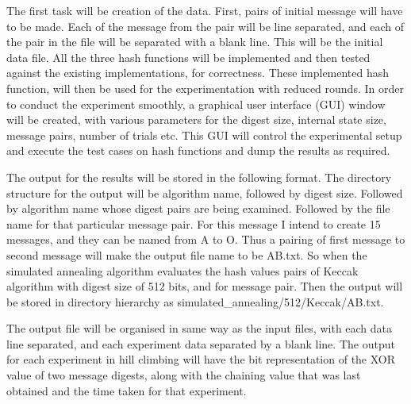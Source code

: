\documentclass[12pt]{artikel3}                  %
\begin{document}
The first task will be creation of the data. First, pairs of initial message will have to be 
made. Each of the message from the pair will be line separated, and each of the pair in the file
will be separated with a blank line. This will be the initial data file. All the three hash functions
will be implemented and then tested against the existing implementations, for correctness. These
implemented hash function, will then be used for the experimentation with reduced rounds. In order
to conduct the experiment smoothly, a graphical user interface (GUI) window will be created, with
various parameters for the digest size, internal state size, message pairs, number of trials etc.
This GUI will control the experimental setup and execute the test cases on hash functions and dump
the results as required.

The output for the results will be stored in the following format. The directory structure for the
output will be algorithm name, followed by digest size. Followed by algorithm name whose digest 
pairs are being examined. Followed by the file name for that particular message pair. For this message 
I intend to create 15 messages, and they can be named from A to O. Thus a pairing of first message to 
second message will make the output file name to be AB.txt. So when the simulated annealing algorithm 
evaluates the hash values pairs of Keccak algorithm with digest size of 512 bits, and for message pair.
Then the output will be stored in directory hierarchy as simulated\_annealing/512/Keccak/AB.txt.

The output file will be organised in same way as the input files, with each data line separated, and 
each experiment data separated by a blank line. The output for each experiment in hill climbing will
have the bit representation of the XOR value of two message digests, along with the chaining value
that was last obtained and the time taken for that experiment.
\end{document}
